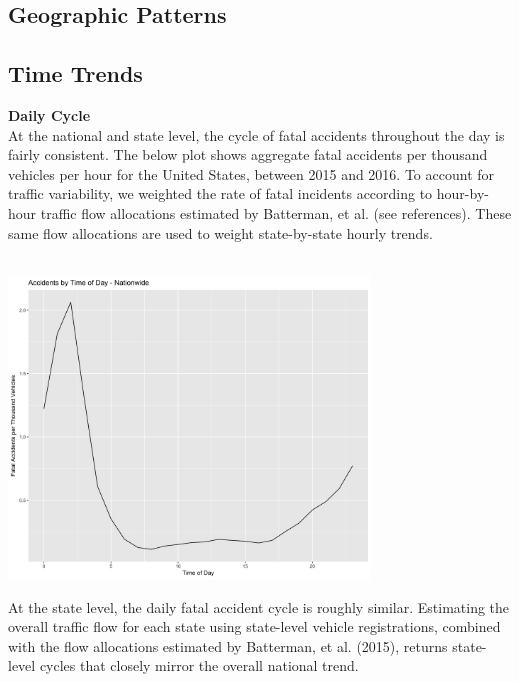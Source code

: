 \documentclass[11pt, oneside,titlepage]{article}   	%
\begin{document}
\subsection*{Geographic Patterns}

\subsection*{Time Trends}
\textbf{Daily Cycle} \\
At the national and state level, the cycle of fatal accidents throughout the day is fairly consistent. The below plot shows aggregate fatal accidents per thousand vehicles per hour for the United States, between 2015 and 2016. To account for traffic variability, we weighted the rate of fatal incidents according to hour-by-hour traffic flow allocations estimated by Batterman, et al. (see references). These same flow allocations are used to weight state-by-state hourly trends. \\
\\
\begin{center}
\includegraphics[width=.75\textwidth,height=8cm,keepaspectratio]{WeightedNationalDayTrends.png}
\end{center}

At the state level, the daily fatal accident cycle is roughly similar. Estimating the overall traffic flow for each state using state-level vehicle registrations, combined with the flow allocations estimated by Batterman, et al. (2015), returns state-level cycles that closely mirror the overall national trend.
\end{document}
